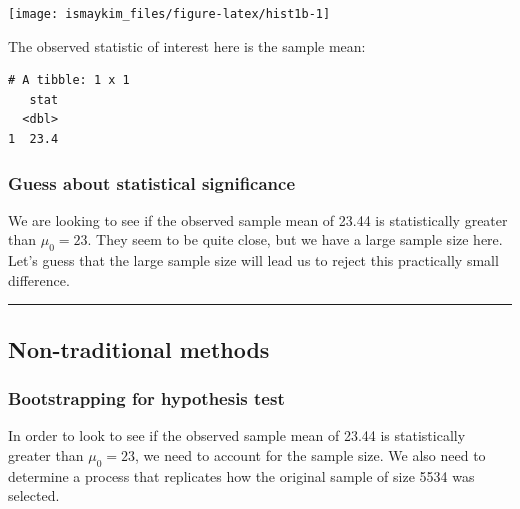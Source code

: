 \documentclass[12pt,]{krantz}
\makeatletter
\newenvironment{Shaded}{\begin{snugshade}}{\end{snugshade}}
\newcommand{\KeywordTok}[1]{\textcolor[rgb]{0.27,0.27,0.27}{\textbf{#1}}}
\newcommand{\DataTypeTok}[1]{\textcolor[rgb]{0.27,0.27,0.27}{#1}}
\newcommand{\StringTok}[1]{\textcolor[rgb]{0.5,0.5,0.5}{#1}}
\newcommand{\OperatorTok}[1]{\textcolor[rgb]{0.43,0.43,0.43}{\textbf{#1}}}
\newcommand{\NormalTok}[1]{#1}
\newenvironment{kframe}{%
\medskip{}
\setlength{\fboxsep}{.8em}
 \def\at@end@of@kframe{}%
 \ifinner\ifhmode%
  \def\at@end@of@kframe{\end{minipage}}%
  \begin{minipage}{\columnwidth}%
 \fi\fi%
 \def\FrameCommand##1{\hskip\@totalleftmargin \hskip-\fboxsep
 \colorbox{shadecolor}{##1}\hskip-\fboxsep
     \hskip-\linewidth \hskip-\@totalleftmargin \hskip\columnwidth}%
 \MakeFramed {\advance\hsize-\width
   \@totalleftmargin\z@ \linewidth\hsize
   \@setminipage}}%
 {\par\unskip\endMakeFramed%
 \at@end@of@kframe}
\renewenvironment{Shaded}{\begin{kframe}}{\end{kframe}}
\theoremstyle{definition}
\theoremstyle{definition}
\theoremstyle{definition}
\theoremstyle{remark}
\makeatother
\begin{document}
\begin{center}\texttt{[image: ismaykim\_files/figure-latex/hist1b-1]} \end{center}

The observed statistic of interest here is the sample mean:

\begin{Shaded}
\end{Shaded}

\begin{verbatim}
# A tibble: 1 x 1
   stat
  <dbl>
1  23.4
\end{verbatim}

\subsubsection*{Guess about statistical
significance}\label{guess-about-statistical-significance}

We are looking to see if the observed sample mean of 23.44 is
statistically greater than \(\mu_0 = 23\). They seem to be quite close,
but we have a large sample size here. Let's guess that the large sample
size will lead us to reject this practically small difference.

\begin{center}\rule{0.5\linewidth}{\linethickness}\end{center}

\subsection{Non-traditional methods}\label{non-traditional-methods}

\subsubsection*{Bootstrapping for hypothesis
test}\label{bootstrapping-for-hypothesis-test}


In order to look to see if the observed sample mean of 23.44 is
statistically greater than \(\mu_0 = 23\), we need to account for the
sample size. We also need to determine a process that replicates how the
original sample of size 5534 was selected.
\end{document}
